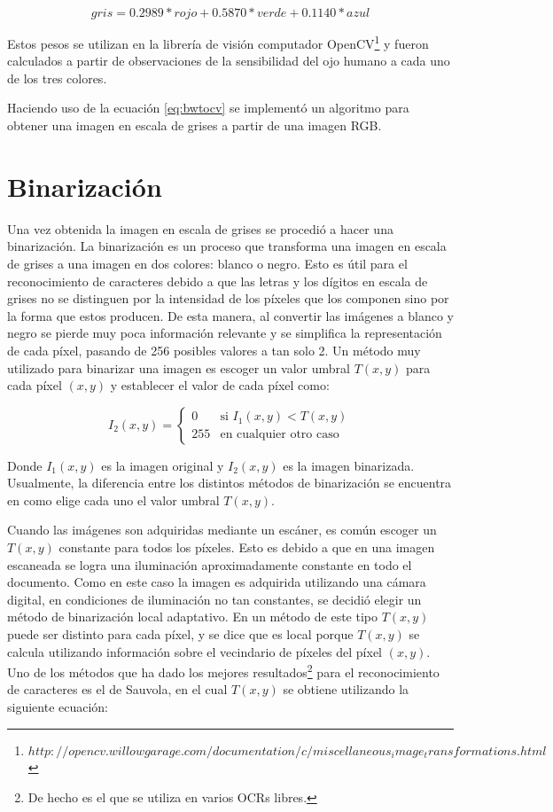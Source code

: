 \documentclass[a4paper, 11pt, oneside]{report}
\begin{document}
\begin{equation}\label{eq:bwtocv}
	gris = 0.2989 * rojo + 0.5870 * verde + 0.1140 * azul 
\end{equation}

Estos pesos se utilizan en la librería de visión computador OpenCV\footnote{$http://opencv.willowgarage.com/documentation/c/miscellaneous_image_transformations.html$} y fueron calculados a partir de observaciones de la sensibilidad del ojo humano a cada uno de los tres colores. 

Haciendo uso de la ecuación \ref{eq:bwtocv} se implementó un algoritmo para obtener una imagen en escala de grises a partir de una imagen RGB. 

\section{Binarización}
\label{sect:binarization}

Una vez obtenida la imagen en escala de grises se procedió a hacer una binarización. La binarización es un proceso que transforma una imagen en escala de grises a una imagen en dos colores: blanco o negro. Esto es útil para el reconocimiento de caracteres debido a que las letras y los dígitos en escala de grises no se distinguen por la intensidad de los píxeles que los componen sino por la forma que estos producen. De esta manera, al convertir las imágenes a blanco y negro se pierde muy poca información relevante y se simplifica la representación de cada píxel, pasando de 256 posibles valores a tan solo 2. Un método muy utilizado para binarizar una imagen es escoger un valor umbral $T(x,y)$ para cada píxel $(x,y)$ y establecer el valor de cada píxel como:

\begin{equation}\label{binEq}
	I_2(x,y) = \left\{ \begin{array}{ll}
		0   & \mbox{si $I_1(x,y) < T(x,y)$} \\
		255 & \mbox{en cualquier otro caso}
	\end{array} \right. 
\end{equation}

Donde $I_1(x,y)$ es la imagen original y $I_2(x,y)$ es la imagen binarizada. Usualmente, la diferencia entre los distintos métodos de binarización se encuentra en como elige cada uno el valor umbral $T(x,y)$.

Cuando las imágenes son adquiridas mediante un escáner, es común escoger un $T(x,y)$ constante para todos los píxeles. Esto es debido a que en una imagen escaneada se logra una iluminación aproximadamente constante en todo el documento. Como en este caso la imagen es adquirida utilizando una cámara digital, en condiciones de iluminación no tan constantes, se decidió elegir un método de binarización local adaptativo. En un método de este tipo $T(x,y)$ puede ser distinto para cada píxel, y se dice que es local porque $T(x,y)$ se calcula utilizando información sobre el vecindario de píxeles del píxel $(x,y)$. Uno de los métodos que ha dado los mejores resultados\footnote{De hecho es el que se utiliza en varios OCRs libres.} para el reconocimiento de caracteres es el de Sauvola, en el cual $T(x,y)$ se obtiene utilizando la siguiente ecuación:
\end{document}
